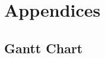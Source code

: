 \documentclass[11pt, titlepage]{article}
\begin{document}
	\tableofcontents
	
	\newpage
	
	
	
	
	
	
	\newpage

	\section*{Appendices}
		\begin{appendices}
			\label{app:gantt}
			\subsection*{Gantt Chart}
			\begin{minipage}{\textwidth}
				\begin{flushright}
				\end{flushright}
			\end{minipage}
		\end{appendices}

	\newpage
	
    \printbibliography
   
\end{document}
